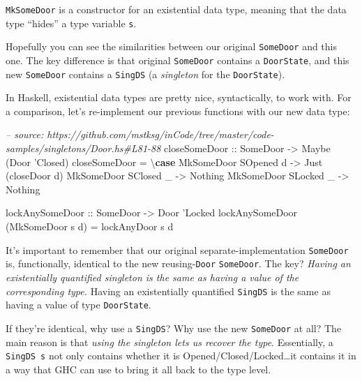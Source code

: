 \documentclass[]{article}
\newenvironment{Shaded}{}{}
\newcommand{\KeywordTok}[1]{\textcolor[rgb]{0.00,0.44,0.13}{\textbf{#1}}}
\newcommand{\DataTypeTok}[1]{\textcolor[rgb]{0.56,0.13,0.00}{#1}}
\newcommand{\CharTok}[1]{\textcolor[rgb]{0.25,0.44,0.63}{#1}}
\newcommand{\CommentTok}[1]{\textcolor[rgb]{0.38,0.63,0.69}{\textit{#1}}}
\newcommand{\OtherTok}[1]{\textcolor[rgb]{0.00,0.44,0.13}{#1}}
\newcommand{\FunctionTok}[1]{\textcolor[rgb]{0.02,0.16,0.49}{#1}}
\newcommand{\NormalTok}[1]{#1}
\begin{document}
\texttt{MkSomeDoor} is a constructor for an existential data type, meaning that
the data type ``hides'' a type variable \texttt{s}.

Hopefully you can see the similarities between our original \texttt{SomeDoor}
and this one. The key difference is that original \texttt{SomeDoor} contains a
\texttt{DoorState}, and this new \texttt{SomeDoor} contains a \texttt{SingDS} (a
\emph{singleton} for the \texttt{DoorState}).

In Haskell, existential data types are pretty nice, syntactically, to work with.
For a comparison, let's re-implement our previous functions with our new data
type:

\begin{Shaded}
\begin{Highlighting}[]
\CommentTok{-- source: https://github.com/mstksg/inCode/tree/master/code-samples/singletons/Door.hs#L81-88}
\OtherTok{closeSomeDoor ::} \DataTypeTok{SomeDoor} \OtherTok{->} \DataTypeTok{Maybe}\NormalTok{ (}\DataTypeTok{Door} \CharTok{'Closed)}
\NormalTok{closeSomeDoor }\FunctionTok{=}\NormalTok{ \textbackslash{}}\KeywordTok{case}
    \DataTypeTok{MkSomeDoor} \DataTypeTok{SOpened}\NormalTok{ d }\OtherTok{->} \DataTypeTok{Just}\NormalTok{ (closeDoor d)}
    \DataTypeTok{MkSomeDoor} \DataTypeTok{SClosed}\NormalTok{ _ }\OtherTok{->} \DataTypeTok{Nothing}
    \DataTypeTok{MkSomeDoor} \DataTypeTok{SLocked}\NormalTok{ _ }\OtherTok{->} \DataTypeTok{Nothing}

\OtherTok{lockAnySomeDoor ::} \DataTypeTok{SomeDoor} \OtherTok{->} \DataTypeTok{Door} \CharTok{'Locked}
\NormalTok{lockAnySomeDoor (}\DataTypeTok{MkSomeDoor}\NormalTok{ s d) }\FunctionTok{=}\NormalTok{ lockAnyDoor s d}
\end{Highlighting}
\end{Shaded}

It's important to remember that our original separate-implementation
\texttt{SomeDoor} is, functionally, identical to the new reusing-\texttt{Door}
\texttt{SomeDoor}. The key? \emph{Having an existentially quantified singleton
is the same as having a value of the corresponding type.} Having an
existentially quantified \texttt{SingDS} is the same as having a value of type
\texttt{DoorState}.

If they're identical, why use a \texttt{SingDS}? Why use the new
\texttt{SomeDoor} at all? The main reason is that \emph{using the singleton lets
us recover the type}. Essentially, a \texttt{SingDS\ s} not only contains
whether it is Opened/Closed/Locked\ldots{}it contains it in a way that GHC can
use to bring it all back to the type level.
\end{document}
